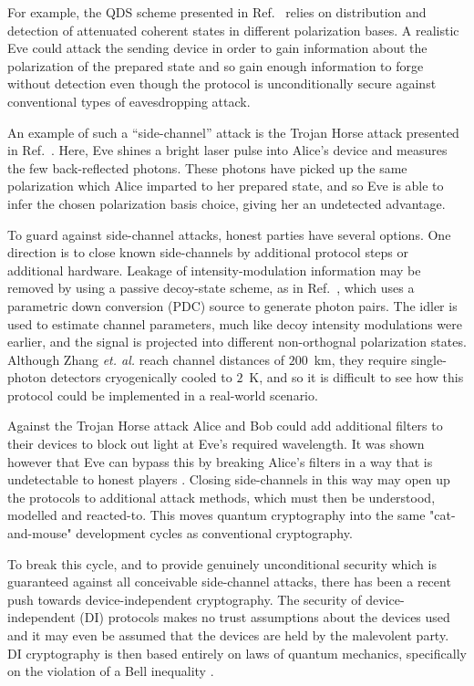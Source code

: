 For example, the QDS scheme presented in Ref.~\cite{Amiri2016} relies on distribution and detection of attenuated coherent states in different polarization bases. A realistic Eve could attack the sending device in order to gain information about the polarization of the prepared state and so gain enough information to forge without detection even though the protocol is unconditionally secure against conventional types of eavesdropping attack.

An example of such a ``side-channel'' attack is the Trojan Horse attack presented in Ref.~\cite{Jain2014}. Here, Eve shines a bright laser pulse into Alice's device and measures the few back-reflected photons. These photons have picked up the same polarization which Alice imparted to her prepared state, and so Eve is able to infer the chosen polarization basis choice, giving her an undetected advantage. %

To guard against side-channel attacks, honest parties have several options. One direction is to close known side-channels by additional protocol steps or additional hardware. Leakage of intensity-modulation information may be removed by using a passive decoy-state scheme, as in Ref.~\cite{Zhang2018b}, which uses a parametric down conversion (PDC) source to generate photon pairs. The idler is used to estimate channel parameters, much like decoy intensity modulations were earlier, and the signal is projected into different non-orthognal polarization states. Although Zhang \emph{et. al.} reach channel distances of $200$~km, they require single-photon detectors cryogenically cooled to $2$~K, and so it is difficult to see how this protocol could be implemented in a real-world scenario.


Against the Trojan Horse attack Alice and Bob could add additional filters to their devices to block out light at Eve's required wavelength. It was shown however that Eve can bypass this by breaking Alice's filters in a way that is undetectable to honest players \cite{Sajeed2016}. Closing side-channels in this way may open up the protocols to additional attack methods, which must then be understood, modelled and reacted-to. This moves quantum cryptography into the same "cat-and-mouse" development cycles as conventional cryptography. 

To break this cycle, and to provide genuinely unconditional security which is guaranteed against all conceivable side-channel attacks, there has been a recent push towards device-independent cryptography. The security of device-independent (DI) protocols makes no trust assumptions about the devices used and it may even be assumed that the  devices are held by the malevolent party. DI cryptography is then based entirely on laws of quantum mechanics, specifically on the violation of a Bell inequality \cite{Vazirani2014, Pironio2009, Colbeck2009}. 

